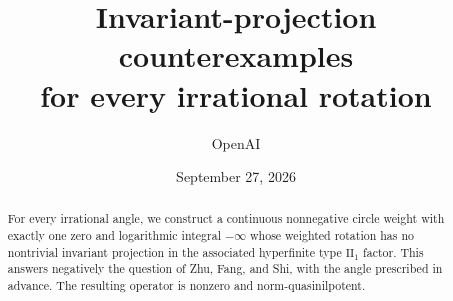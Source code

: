 \documentclass[11pt]{article}
\title{Invariant-projection counterexamples\\for every irrational rotation}
\author{OpenAI}
\date{September 27, 2026}
\theoremstyle{definition}
\theoremstyle{remark}
\numberwithin{equation}{section}
\begin{document}
\maketitle
\begin{abstract}
For every irrational angle, we construct a continuous nonnegative circle
weight with exactly one zero and logarithmic integral $-\infty$ whose
weighted rotation has no nontrivial invariant projection in the associated
hyperfinite type $\mathrm{II}_1$ factor. This answers negatively the question
of Zhu, Fang, and Shi, with the angle prescribed in advance. The resulting
operator is nonzero and norm-quasinilpotent.
\end{abstract}






\appendix


\begingroup\raggedright

\endgroup
\end{document}
